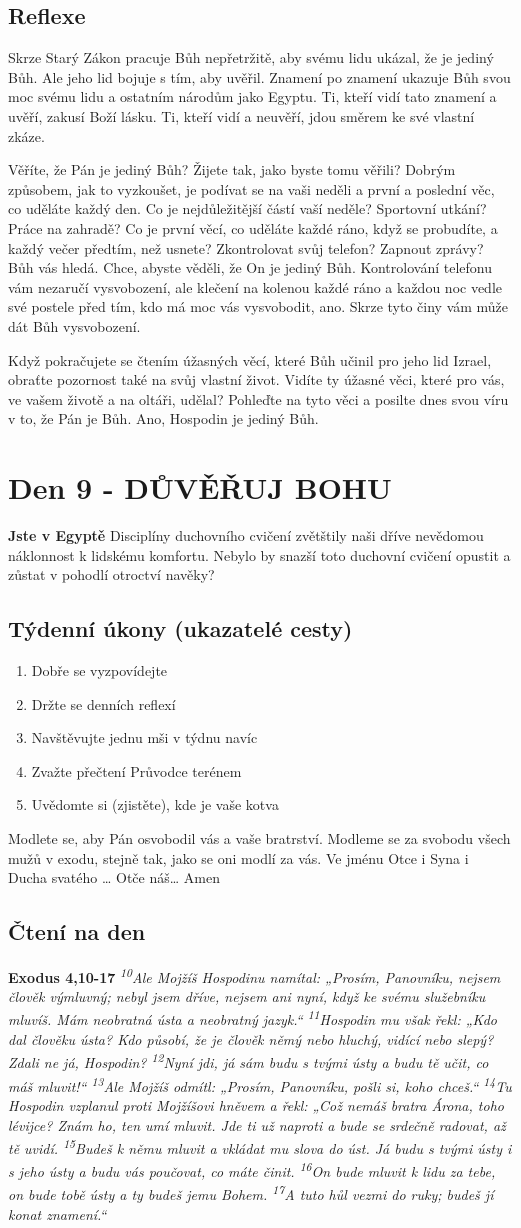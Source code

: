 \documentclass[11pt]{article}
\newcommand{\zacatekDruhyTyden}{
  \textbf{Jste v Egyptě} \newline
  Disciplíny duchovního cvičení zvětštily naši dříve nevědomou náklonnost k lidskému komfortu.
  Nebylo by snazší toto duchovní cvičení opustit a zůstat v pohodlí otroctví navěky?

  \subsection*{Týdenní úkony (ukazatelé cesty)}
\begin{enumerate}
  \item Dobře se vyzpovídejte
  \item Držte se denních reflexí
  \item Navštěvujte jednu mši v týdnu navíc
  \item Zvažte přečtení Průvodce terénem
  \item Uvědomte si (zjistěte), kde je vaše kotva
\end{enumerate}
Modlete se, aby Pán osvobodil vás a vaše bratrství. \newline
Modleme se za svobodu všech mužů v exodu, stejně tak, jako se oni modlí za vás.\newline
Ve jménu Otce i Syna i Ducha svatého …  Otče náš… Amen
}
\begin{document}
\subsection*{Reflexe}
Skrze Starý Zákon pracuje Bůh nepřetržitě, aby svému lidu ukázal, že je jediný Bůh. Ale jeho lid bojuje
s tím, aby uvěřil. Znamení po znamení ukazuje Bůh svou moc svému lidu a ostatním národům jako Egyptu.
Ti, kteří vidí tato znamení a uvěří, zakusí Boží lásku. Ti, kteří vidí a neuvěří, jdou směrem ke své vlastní
zkáze.

Věříte, že Pán je jediný Bůh? Žijete tak, jako byste tomu věřili? Dobrým způsobem, jak to vyzkoušet, je
podívat se na vaši neděli a první a poslední věc, co uděláte každý den. Co je nejdůležitější částí vaší neděle?
Sportovní utkání? Práce na zahradě? Co je první věcí, co uděláte každé ráno, když se probudíte, a každý
večer předtím, než usnete? Zkontrolovat svůj telefon? Zapnout zprávy? Bůh vás hledá. Chce, abyste věděli,
že On je jediný Bůh. Kontrolování telefonu vám nezaručí vysvobození, ale klečení na kolenou každé ráno
a každou noc vedle své postele před tím, kdo má moc vás vysvobodit, ano. Skrze tyto činy vám může dát
Bůh vysvobození.

Když pokračujete se čtením úžasných věcí, které Bůh učinil pro jeho lid Izrael, obraťte pozornost také na
svůj vlastní život. Vidíte ty úžasné věci, které pro vás, ve vašem životě a na oltáři, udělal? Pohleďte na tyto
věci a posilte dnes svou víru v to, že Pán je Bůh. Ano, Hospodin je jediný Bůh.


\newpage
\section{Den 9 - DŮVĚŘUJ BOHU}
\zacatekDruhyTyden
\subsection*{Čtení na den}
\textbf{Exodus 4,10-17}
\newline
\textit{
\textsuperscript{10}Ale Mojžíš Hospodinu namítal: „Prosím, Panovníku, nejsem člověk výmluvný; nebyl jsem dříve, nejsem ani nyní, když ke svému služebníku mluvíš. Mám neobratná ústa a neobratný jazyk.“
\textsuperscript{11}Hospodin mu však řekl: „Kdo dal člověku ústa? Kdo působí, že je člověk němý nebo hluchý, vidící nebo slepý? Zdali ne já, Hospodin?
\textsuperscript{12}Nyní jdi, já sám budu s tvými ústy a budu tě učit, co máš mluvit!“
\textsuperscript{13}Ale Mojžíš odmítl: „Prosím, Panovníku, pošli si, koho chceš.“
\textsuperscript{14}Tu Hospodin vzplanul proti Mojžíšovi hněvem a řekl: „Což nemáš bratra Árona, toho lévijce? Znám ho, ten umí mluvit. Jde ti už naproti a bude se srdečně radovat, až tě uvidí.
\textsuperscript{15}Budeš k němu mluvit a vkládat mu slova do úst. Já budu s tvými ústy i s jeho ústy a budu vás poučovat, co máte činit.
\textsuperscript{16}On bude mluvit k lidu za tebe, on bude tobě ústy a ty budeš jemu Bohem.
\textsuperscript{17}A tuto hůl vezmi do ruky; budeš jí konat znamení.“
}
\end{document}
